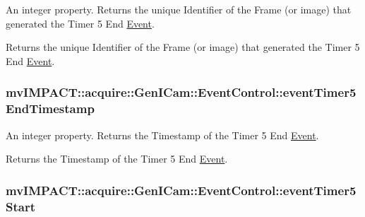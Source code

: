 An integer property. Returns the unique Identifier of the Frame (or image) that generated the Timer 5 End \hyperlink{classmv_i_m_p_a_c_t_1_1acquire_1_1_event}{Event}. 

Returns the unique Identifier of the Frame (or image) that generated the Timer 5 End \hyperlink{classmv_i_m_p_a_c_t_1_1acquire_1_1_event}{Event}. \hypertarget{classmv_i_m_p_a_c_t_1_1acquire_1_1_gen_i_cam_1_1_event_control_a9f312bba0140be0288f73c1605981269}{
\subsubsection[{event\+Timer5\+End\+Timestamp}]{ mv\+I\+M\+P\+A\+C\+T\+::acquire\+::\+Gen\+I\+Cam\+::\+Event\+Control\+::event\+Timer5\+End\+Timestamp}}\label{classmv_i_m_p_a_c_t_1_1acquire_1_1_gen_i_cam_1_1_event_control_a9f312bba0140be0288f73c1605981269}


An integer property. Returns the Timestamp of the Timer 5 End \hyperlink{classmv_i_m_p_a_c_t_1_1acquire_1_1_event}{Event}. 

Returns the Timestamp of the Timer 5 End \hyperlink{classmv_i_m_p_a_c_t_1_1acquire_1_1_event}{Event}. \hypertarget{classmv_i_m_p_a_c_t_1_1acquire_1_1_gen_i_cam_1_1_event_control_a0606bebea03d1c1f706daa8321671b6f}{
\subsubsection[{event\+Timer5\+Start}]{ mv\+I\+M\+P\+A\+C\+T\+::acquire\+::\+Gen\+I\+Cam\+::\+Event\+Control\+::event\+Timer5\+Start}}\label{classmv_i_m_p_a_c_t_1_1acquire_1_1_gen_i_cam_1_1_event_control_a0606bebea03d1c1f706daa8321671b6f}


